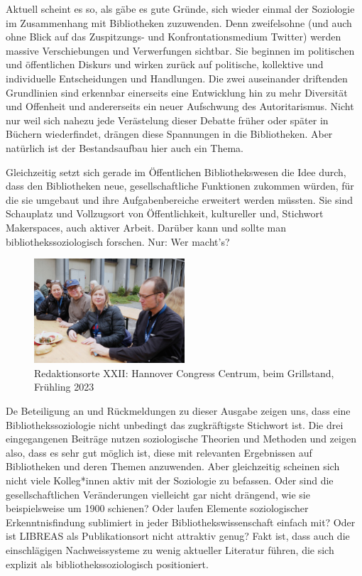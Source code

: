 \documentclass[a4paper,
fontsize=11pt,
oneside,
numbers=noperiodatend,
parskip=half-,
bibliography=totoc,
final
]{scrartcl}
\begin{document}
Aktuell scheint es so, als gäbe es gute Gründe, sich wieder einmal der
Soziologie im Zusammenhang mit Bibliotheken zuzuwenden. Denn
zweifelsohne (und auch ohne Blick auf das Zuspitzungs- und
Konfrontationsmedium Twitter) werden massive Verschiebungen und
Verwerfungen sichtbar. Sie beginnen im politischen und öffentlichen
Diskurs und wirken zurück auf politische, kollektive und individuelle
Entscheidungen und Handlungen. Die zwei auseinander driftenden
Grundlinien sind erkennbar einerseits eine Entwicklung hin zu mehr
Diversität und Offenheit und andererseits ein neuer Aufschwung des
Autoritarismus. Nicht nur weil sich nahezu jede Verästelung dieser
Debatte früher oder später in Büchern wiederfindet, drängen diese
Spannungen in die Bibliotheken. Aber natürlich ist der Bestandsaufbau
hier auch ein Thema.

Gleichzeitig setzt sich gerade im Öffentlichen Bibliothekswesen die Idee
durch, dass den Bibliotheken neue, gesellschaftliche Funktionen zukommen
würden, für die sie umgebaut und ihre Aufgabenbereiche erweitert werden
müssten. Sie sind Schauplatz und Vollzugsort von Öffentlichkeit,
kultureller und, Stichwort Makerspaces, auch aktiver Arbeit. Darüber
kann und sollte man bibliothekssoziologisch forschen. Nur: Wer macht's?

\begin{figure}
\centering
\includegraphics[width=0.5\textwidth]{editorial.jpg}
\caption{Redaktionsorte XXII: Hannover Congress
Centrum, beim Grillstand, Frühling 2023}
\end{figure}

De Beteiligung an und Rückmeldungen zu dieser Ausgabe zeigen uns, dass
eine Bibliothekssoziologie nicht unbedingt das zugkräftigste Stichwort
ist. Die drei eingegangenen Beiträge nutzen soziologische Theorien und
Methoden und zeigen also, dass es sehr gut möglich ist, diese mit
relevanten Ergebnissen auf Bibliotheken und deren Themen anzuwenden.
Aber gleichzeitig scheinen sich nicht viele Kolleg*innen aktiv mit der
Soziologie zu befassen. Oder sind die gesellschaftlichen Veränderungen
vielleicht gar nicht drängend, wie sie beispielsweise um 1900 schienen?
Oder laufen Elemente soziologischer Erkenntnisfindung sublimiert in
jeder Bibliothekswissenschaft einfach mit? Oder ist LIBREAS als
Publikationsort nicht attraktiv genug? Fakt ist, dass auch die
einschlägigen Nachweissysteme zu wenig aktueller Literatur führen, die
sich explizit als bibliothekssoziologisch positioniert.
\end{document}
